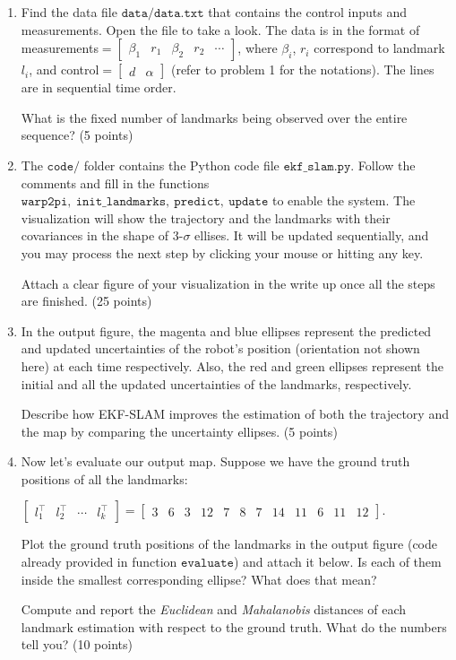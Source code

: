 \documentclass[12pt, a4paper]{article}
\begin{document}
\begin{enumerate}
\item Find the data file $\mathtt{data/data.txt}$ that contains the
control inputs and measurements. Open the file to take a look. The
data is in the format of measurements$=\left[\begin{array}{ccccc}
\beta_{1} & r_{1} & \beta_{2} & r_{2} & \cdots\end{array}\right]$, where $\beta_{i}$, $r_{i}$ correspond to landmark $l_{i}$, and control$=\left[\begin{array}{cc}
    d & \alpha\end{array}\right]$ (refer to problem 1 for the notations). The
lines are in sequential time order. 

What is the fixed number
of landmarks being observed over the entire sequence? (5 points)

\item The $\mathtt{code/}$ folder contains the Python code file
$\mathtt{ekf\_slam.py}$. Follow the comments and fill in the functions $\mathtt{warp2pi},~\mathtt{init\_landmarks}, ~\mathtt{predict}, ~\mathtt{update}$ to enable the system. The visualization will show the trajectory and the landmarks with their covariances in the shape of 3-$\sigma$ ellises. It will be updated sequentially, and you may process the next step by clicking your mouse or hitting any key.

Attach a clear figure of your
visualization in the write up once all the steps are finished. (25 points)

\item In the output figure, the magenta and blue ellipses represent
the predicted and updated uncertainties of the robot's position (orientation
not shown here) at each time respectively. Also, the red and green
ellipses represent the initial and all the updated uncertainties of
the landmarks, respectively. 

Describe how EKF-SLAM improves the estimation
of both the trajectory and the map by comparing the uncertainty ellipses.
(5 points)

\item Now let's evaluate our output map. Suppose we have the ground
truth positions of all the landmarks: 

$\left[\begin{array}{cccc}
l_{1}^{\top} & l_{2}^{\top} & \cdots & l_{k}^{\top}\end{array}\right]=\left[\begin{array}{cccccccccccc}
3 & 6 & 3 & 12 & 7 & 8 & 7 & 14 & 11 & 6 & 11 & 12\end{array}\right]$.

Plot the ground truth positions of the landmarks in the output figure
(code already provided in function $\mathtt{evaluate}$)
and attach it below. Is each of them inside the smallest corresponding
ellipse? What does that mean? 

Compute and report the \emph{Euclidean} and
\emph{Mahalanobis} distances of each landmark estimation with respect
to the ground truth. What do the numbers tell you? (10 points)
\end{enumerate}
\end{document}

